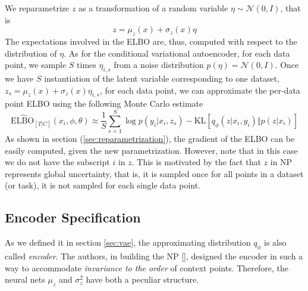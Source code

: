 We reparametrize $z$ as a transformation of a random variable $\eta \sim \mathcal{N}\left(0, I\right)$, that is
\begin{equation*}
    z = \mu_z(x) + \sigma_z(x) \eta 
\end{equation*}
The expectations involved in the ELBO are, thus, computed with respect to the distribution of $\eta$. As for the conditional variational autoencoder, for each data point, we sample $S$ times $\eta_{i,s}$ from a noise distribution $p(\eta) = \mathcal{N}(0,I)$. Once we have $S$ instantiation of the latent variable corresponding to one dataset, $z_s =  \mu_z(x) + \sigma_z(x) \eta_{i,s} $, for each data point, we can approximate the per-data point ELBO using the following Monte Carlo estimate
\begin{equation*}
    \widehat{\mathrm{ELBO}}_{[T|C]}(x_i, \phi, \theta) \approx \frac{1}{S}\sum_{s=1}^{S} \log p(y_i|x_i, z_{s}) - \mathrm{KL}[q_\phi(z|x_i, y_i)\Vert p(z|x_i)]
\end{equation*}
As shown in section (\cref{sec:reparametrization}), the gradient of the ELBO can be easily computed, given the new parametrization. However, note that in this case we do not have the subscript $i$ in $z$. This is motivated by the fact that $z$ in NP represents global uncertainty, that is, it is sampled once for all points in a dataset (or task), it is not sampled for each single data point.



\subsection{Encoder Specification}
As we defined it in section \cref{sec:vae}, the approximating distribution $q_\phi$ is also called \textit{encoder}. The authors, in building the NP [\cite{Garnelo2018a, Garnelo2018b}], designed the encoder in such a way to accommodate \textit{invariance to the order} of context points. Therefore, the neural nets $\mu_z$ and $\sigma^2_z$ have both a peculiar structure. 

